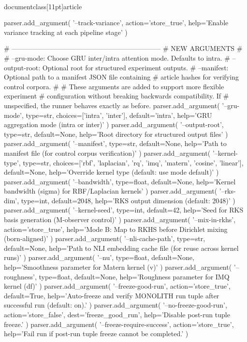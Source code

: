 \\documentclass[11pt]{article}
\begin{document}
\begin{CodeBlock}
    parser.add_argument(
        '--track-variance',
        action='store_true',
        help='Enable variance tracking at each pipeline stage'
    )

    # ------------------------------------------------------------------
    # NEW ARGUMENTS
    #
    # --gru-mode: Choose GRU inter/intra attention mode. Defaults to intra.
    # --output-root: Optional root for structured experiment outputs.
    # --manifest: Optional path to a manifest JSON file containing
    #             article hashes for verifying control corpora.
    #
    # These arguments are added to support more flexible experiment
    # configuration without breaking backwards compatibility. If
    # unspecified, the runner behaves exactly as before.
    parser.add_argument(
        '--gru-mode',
        type=str,
        choices=['intra', 'inter'],
        default='intra',
        help='GRU aggregation mode (intra or inter)'
    )
    parser.add_argument(
        '--output-root',
        type=str,
        default=None,
        help='Root directory for structured output files'
    )
    parser.add_argument(
        '--manifest',
        type=str,
        default=None,
        help='Path to manifest file (for control corpus verification)'
    )
    parser.add_argument(
        '--kernel-type',
        type=str,
        choices=['rbf', 'laplacian', 'rq', 'imq', 'matern', 'cosine', 'linear'],
        default=None,
        help='Override kernel type (default: use mode default)'
    )
    parser.add_argument(
        '--bandwidth',
        type=float,
        default=None,
        help='Kernel bandwidth (sigma) for RBF/Laplacian kernels'
    )
    parser.add_argument(
        '--rks-dim',
        type=int,
        default=2048,
        help='RKS output dimension (default: 2048)'
    )
    parser.add_argument(
        '--kernel-seed',
        type=int,
        default=42,
        help='Seed for RKS basis generation (M-observer control)'
    )
    parser.add_argument(
        '--mix-in-rkhs',
        action='store_true',
        help='Mode B: Map to RKHS before Dirichlet mixing (born-aligned)'
    )
    parser.add_argument(
        '--nli-cache-path',
        type=str,
        default=None,
        help='Path to NLI embedding cache file (for reuse across kernel runs)'
    )
    parser.add_argument(
        '--nu',
        type=float,
        default=None,
        help='Smoothness parameter for Matern kernel (v)'
    )
    parser.add_argument(
        '--roughness',
        type=float,
        default=None,
        help='Roughness parameter for IMQ kernel (df)'
    )
    parser.add_argument(
        '--freeze-good-run',
        action='store_true',
        default=True,
        help='Auto-freeze and verify MONOLITH run tuple after successful run (default: on).'
    )
    parser.add_argument(
        '--no-freeze-good-run',
        action='store_false',
        dest='freeze_good_run',
        help='Disable post-run tuple freeze.'
    )
    parser.add_argument(
        '--freeze-require-success',
        action='store_true',
        help='Fail run if post-run tuple freeze cannot be completed.'
    )
    

\end{CodeBlock}
\end{document}
